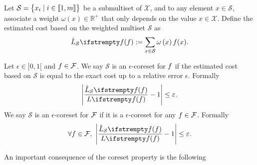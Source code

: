 Let $\mathcal{S}=\begin{Bmatrix}
x_{i} \mid i\in \llbracket 1,m \rrbracket
\end{Bmatrix}$ be a submultiset of $\mathcal{X}$, and to any element $x \in \mathcal{S}$, associate a weight $\omega\left(x\right) \in \mathbb{R}^{+}$ that only depends on the value $x \in  \mathcal{X}$. Define the estimated cost based on the weighted multiset $\mathcal{S}$ as
\begin{equation*}
    \estloss{\mathcal{S}}{\query}:=\sum_{x \in \mathcal{S}} \omega\left(x\right) \query(x).
\end{equation*}
\begin{tcolorbox}
    
    \begin{definition}[Coreset]
        \label{def_coresetprop}
        Let $\epsilon \in {]}0,1{[}$ and $f \in \mathcal{F}$. We say $\mathcal{S}$ is an $\epsilon$-coreset for $f$ if the estimated cost based on $\mathcal{S}$ is equal to the exact cost up to a relative error $\epsilon$. Formally
        \begin{equation}
            \label{eqn_querycoresetprop}
            \left|\frac{\estloss{\mathcal{S}}{\query}}{\loss{\query}}-1\right| \le \epsilon.
        \end{equation}
        We say $\mathcal{S}$ is an $\epsilon$-coreset for $\mathcal{F}$ if it is a $\epsilon$-coreset for any $f \in \mathcal{F}$. Formally
        \begin{equation}
            \label{eqn_qsetcoresetprop}
            \forall \query \in \qset,\ \left|\frac{\estloss{\mathcal{S}}{\query}}{\loss{\query}}-1\right| \le \epsilon.
        \end{equation}
    \end{definition}
\end{tcolorbox}

An important consequence of the coreset property is the following

